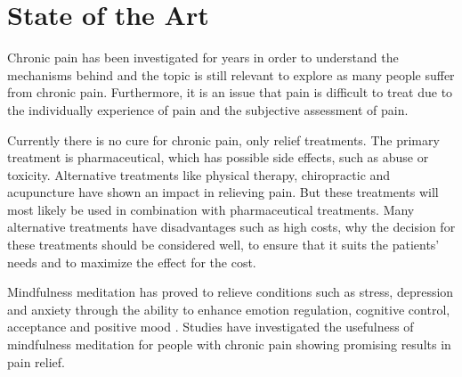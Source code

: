 \section{State of the Art} \label{sec:SOTA}




Chronic pain has been investigated for years in order to understand the mechanisms behind and the topic is still relevant to explore as many people suffer from chronic pain. Furthermore, it is an issue that pain is difficult to treat due to the individually experience of pain and the subjective assessment of pain. \cite{Briggs2010,Norton1999}

Currently there is no cure for chronic pain, only relief treatments. The primary treatment is pharmaceutical, which has possible side effects, such as abuse or toxicity. Alternative treatments like physical therapy, chiropractic and acupuncture have shown an impact in relieving pain. But these treatments will most likely be used in combination with pharmaceutical treatments. Many alternative treatments have disadvantages such as high costs, why the decision for these treatments should be considered well, to ensure that it suits the patients’ needs and to maximize the effect for the cost. \cite{marcus2009,pope2017}

Mindfulness meditation has proved to relieve conditions such as stress, depression and anxiety through the ability to enhance emotion regulation, cognitive control, acceptance and positive mood \cite{Zeidan2012,Zeidan2016}. Studies have investigated the usefulness of mindfulness meditation for people with chronic pain showing promising results in pain relief. \cite{Kabat1982,Rosenzweig2010}

